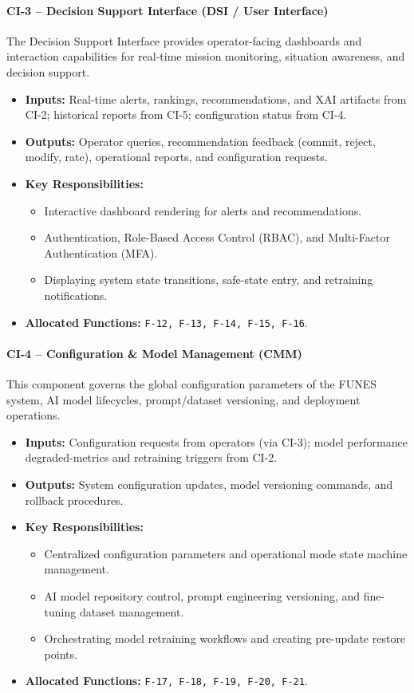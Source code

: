 \paragraph{CI-3 -- Decision Support Interface (DSI / User Interface)}
The Decision Support Interface provides operator-facing dashboards and interaction capabilities for real-time mission monitoring, situation awareness, and decision support.
\begin{itemize}
    \item \textbf{Inputs:} Real-time alerts, rankings, recommendations, and XAI artifacts from CI-2; historical reports from CI-5; configuration status from CI-4.
    \item \textbf{Outputs:} Operator queries, recommendation feedback (commit, reject, modify, rate), operational reports, and configuration requests.
    \item \textbf{Key Responsibilities:}
    \begin{itemize}
        \item Interactive dashboard rendering for alerts and recommendations.
        \item Authentication, Role-Based Access Control (RBAC), and Multi-Factor Authentication (MFA).
        \item Displaying system state transitions, safe-state entry, and retraining notifications.
    \end{itemize}
    \item \textbf{Allocated Functions:} \texttt{F-12, F-13, F-14, F-15, F-16}.
\end{itemize}

\paragraph{CI-4 -- Configuration \& Model Management (CMM)}
This component governs the global configuration parameters of the FUNES system, AI model lifecycles, prompt/dataset versioning, and deployment operations.
\begin{itemize}
    \item \textbf{Inputs:} Configuration requests from operators (via CI-3); model performance degraded-metrics and retraining triggers from CI-2.
    \item \textbf{Outputs:} System configuration updates, model versioning commands, and rollback procedures.
    \item \textbf{Key Responsibilities:}
    \begin{itemize}
        \item Centralized configuration parameters and operational mode state machine management.
        \item AI model repository control, prompt engineering versioning, and fine-tuning dataset management.
        \item Orchestrating model retraining workflows and creating pre-update restore points.
    \end{itemize}
    \item \textbf{Allocated Functions:} \texttt{F-17, F-18, F-19, F-20, F-21}.
\end{itemize}

